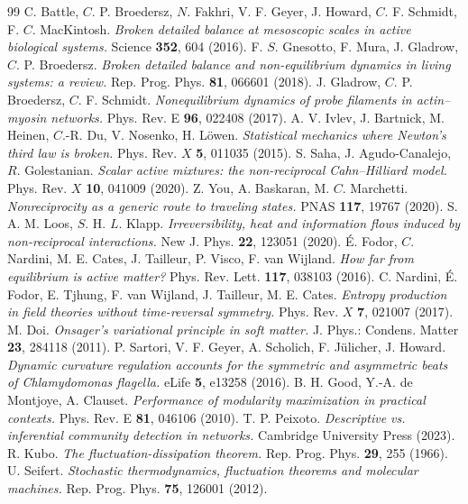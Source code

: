 \documentclass[aps,pre,preprint,superscriptaddress,nofootinbib,longbibliography]{revtex4-2}
\begin{document}
\begin{thebibliography}{99}
 C. Battle, $C$. P. Broedersz, $N$. Fakhri, V. F. Geyer, J. Howard, $C$. F. Schmidt, F. $C$. MacKintosh. \emph{Broken detailed balance at mesoscopic scales in active biological systems.} Science \textbf{352}, 604 (2016).
 F. $S$. Gnesotto, F. Mura, J. Gladrow, $C$. P. Broedersz. \emph{Broken detailed balance and non-equilibrium dynamics in living systems: a review.} Rep. Prog. Phys. \textbf{81}, 066601 (2018).
 J. Gladrow, $C$. P. Broedersz, $C$. F. Schmidt. \emph{Nonequilibrium dynamics of probe filaments in actin--myosin networks.} Phys. Rev. E \textbf{96}, 022408 (2017).
 A. V. Ivlev, J. Bartnick, M. Heinen, $C$.-R. Du, V. Nosenko, H. L\"owen. \emph{Statistical mechanics where Newton's third law is broken.} Phys. Rev. $X$ \textbf{5}, 011035 (2015).
 S. Saha, J. Agudo-Canalejo, $R$. Golestanian. \emph{Scalar active mixtures: the non-reciprocal Cahn--Hilliard model.} Phys. Rev. $X$ \textbf{10}, 041009 (2020).
 Z. You, A. Baskaran, M. $C$. Marchetti. \emph{Nonreciprocity as a generic route to traveling states.} PNAS \textbf{117}, 19767 (2020).
 S. A. M. Loos, $S$. H. $L$. Klapp. \emph{Irreversibility, heat and information flows induced by non-reciprocal interactions.} New J. Phys. \textbf{22}, 123051 (2020).
 \'E. Fodor, $C$. Nardini, M. E. Cates, J. Tailleur, P. Visco, F. van Wijland. \emph{How far from equilibrium is active matter?} Phys. Rev. Lett. \textbf{117}, 038103 (2016).
 C. Nardini, \'E. Fodor, E. Tjhung, F. van Wijland, J. Tailleur, M. E. Cates. \emph{Entropy production in field theories without time-reversal symmetry.} Phys. Rev. $X$ \textbf{7}, 021007 (2017).
 M. Doi. \emph{Onsager's variational principle in soft matter.} J. Phys.: Condens. Matter \textbf{23}, 284118 (2011).
 P. Sartori, V. F. Geyer, A. Scholich, F. J\"ulicher, J. Howard. \emph{Dynamic curvature regulation accounts for the symmetric and asymmetric beats of Chlamydomonas flagella.} eLife \textbf{5}, e13258 (2016).
 B. H. Good, Y.-A. de Montjoye, A. Clauset. \emph{Performance of modularity maximization in practical contexts.} Phys. Rev. E \textbf{81}, 046106 (2010).
 T. P. Peixoto. \emph{Descriptive vs. inferential community detection in networks.} Cambridge University Press (2023).
 R. Kubo. \emph{The fluctuation-dissipation theorem.} Rep. Prog. Phys. \textbf{29}, 255 (1966).
 U. Seifert. \emph{Stochastic thermodynamics, fluctuation theorems and molecular machines.} Rep. Prog. Phys. \textbf{75}, 126001 (2012).

\end{thebibliography}
\end{document}
